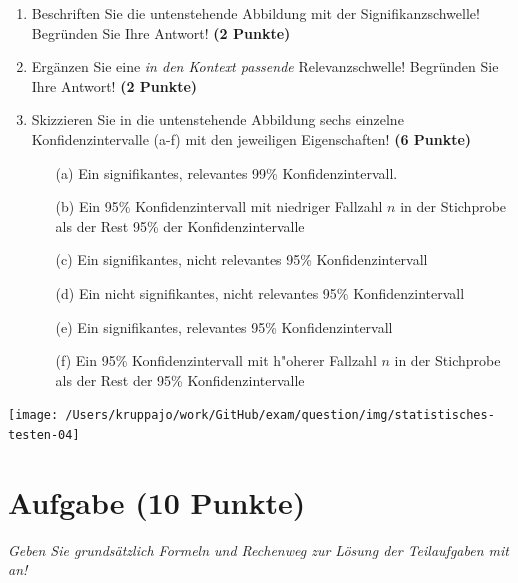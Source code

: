 \documentclass[a4paper, 9pt]{scrartcl}\usepackage[]{graphicx}\usepackage[]{xcolor}
\begin{document}
\begin{enumerate}
\item Beschriften Sie die untenstehende Abbildung mit der Signifikanzschwelle! Begründen Sie Ihre Antwort! \textbf{(2 Punkte)}
\item Ergänzen Sie eine \textit{in den Kontext passende} Relevanzschwelle! Begründen Sie Ihre Antwort! \textbf{(2 Punkte)} 
\item Skizzieren Sie in die untenstehende Abbildung sechs einzelne Konfidenzintervalle (a-f) mit den
  jeweiligen Eigenschaften! \textbf{(6 Punkte)}
  \begin{itemize}
  \item[(a)] Ein signifikantes, relevantes 99\% Konfidenzintervall. 	
  \item[(b)] Ein 95\% Konfidenzintervall mit niedriger Fallzahl $n$ in der Stichprobe als der Rest 95\% der Konfidenzintervalle 	
  \item[(c)] Ein signifikantes, nicht relevantes 95\% Konfidenzintervall 	
  \item[(d)] Ein nicht signifikantes, nicht relevantes 95\% Konfidenzintervall 
  \item[(e)] Ein signifikantes, relevantes 95\% Konfidenzintervall
  \item[(f)] Ein 95\% Konfidenzintervall mit h{"o}herer Fallzahl $n$ in der Stichprobe als der Rest der 95\% Konfidenzintervalle
  \end{itemize}
\end{enumerate}

\begin{center}
  \texttt{[image: /Users/kruppajo/work/GitHub/exam/question/img/statistisches-testen-04]}
\end{center}


 
\clearpage

\section{Aufgabe \hfill (10 Punkte)}

\textit{Geben Sie grundsätzlich Formeln und Rechenweg zur Lösung der Teilaufgaben mit an!} \\[1Ex]
\end{document}
